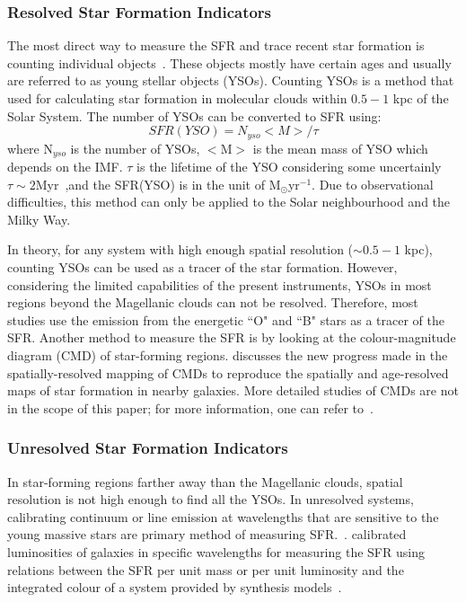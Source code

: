 \subsubsection{Resolved Star Formation Indicators}
The most direct way to measure the SFR and trace recent star formation is counting individual objects~\citep{Kennicutt12}. 
These objects mostly have certain ages and usually are referred to as young stellar objects (YSOs). 
Counting YSOs is a method that used for calculating star formation in molecular clouds within $0.5- 1$ kpc of the Solar System. 
The number of YSOs can be converted to SFR using: 
\begin{equation}
SFR(YSO) = N_{yso} <M>/\tau 
\end{equation}
where N$_{yso}$ is the number of YSOs, $<$M$>$ is the mean mass of YSO which depends on the IMF. 
$\tau$ is the lifetime of the YSO considering some uncertainly $\tau \sim 2$Myr~\citep{Evans09},and the SFR(YSO) is in the unit of M$_{\odot}$yr$^{-1}$. 
Due to observational difficulties, this method can only be applied to the Solar neighbourhood and the Milky Way. 

In theory, for any system with high enough spatial resolution ($\sim 0.5- 1$ kpc), counting YSOs can be used as a tracer of the star formation. 
However, considering the limited capabilities of the present instruments, YSOs in most regions beyond the Magellanic clouds can not be resolved. 
Therefore, most studies use the emission from the energetic ``O" and ``B" stars as a tracer of the SFR. 
Another method to measure the SFR is by looking at the colour-magnitude diagram (CMD) of star-forming regions. 
\cite{Kennicutt12} discusses the new progress made in the spatially-resolved mapping of CMDs to reproduce the spatially and age-resolved maps of star formation in nearby galaxies. 
More detailed studies of CMDs are not in the scope of this paper; for more information, one can refer to~\citep{Kennicutt12}. 

\subsubsection{Unresolved Star Formation Indicators}

 In star-forming regions farther away than the Magellanic clouds, spatial resolution is not high enough to find all the YSOs. 
 In unresolved systems, calibrating continuum or line emission at wavelengths that are sensitive to the young massive stars are primary method of measuring SFR.~\citep[e.g.,][]{Kennicutt98b, Kewley02, Bell03, Calzetti07, Calzetti08, Calzetti10, Calzetti13, Kennicutt07, Kennicutt09, Boquien10, Hao11, Kennicutt12}. 
\cite{Kennicutt98b} calibrated luminosities of galaxies in specific wavelengths for measuring the SFR using relations between the SFR per unit mass or per unit luminosity and the integrated colour of a system provided by synthesis models~\citep[e.g.,][]{Bruzual93}. 

